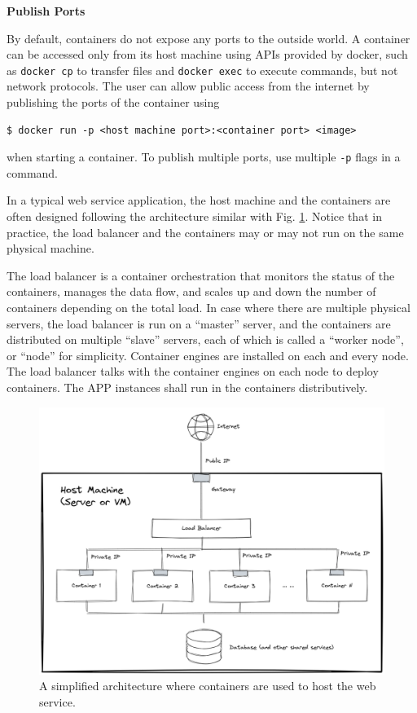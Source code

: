 \vspace{0.1in}
\noindent \textbf{Publish Ports}
\vspace{0.1in}

By default, containers do not expose any ports to the outside world. A container can be accessed only from its host machine using APIs provided by docker, such as \verb|docker cp| to transfer files and \verb|docker exec| to execute commands, but not network protocols. The user can allow public access from the internet by publishing the ports of the container using
\begin{lstlisting}
$ docker run -p <host machine port>:<container port> <image>
\end{lstlisting}
when starting a container. To publish multiple ports, use multiple \verb|-p| flags in a command.

In a typical web service application, the host machine and the containers are often designed following the architecture similar with Fig. \ref{ch:vac:fig:containerwebserverarchitecture}. Notice that in practice, the load balancer and the containers may or may not run on the same physical machine.

The load balancer is a container orchestration that monitors the status of the containers, manages the data flow, and scales up and down the number of containers depending on the total load. In case where there are multiple physical servers, the load balancer is run on a ``master'' server, and the containers are distributed on multiple ``slave'' servers, each of which is called a ``worker node'', or ``node'' for simplicity. Container engines are installed on each and every node. The load balancer talks with the container engines on each node to deploy containers. The APP instances shall run in the containers distributively.
\begin{figure}[htbp]
	\centering
	\includegraphics[width=350pt]{chapters/part-3/figures/containerwebserverarchitecture.png}
	\caption{A simplified architecture where containers are used to host the web service.} \label{ch:vac:fig:containerwebserverarchitecture}
\end{figure}


